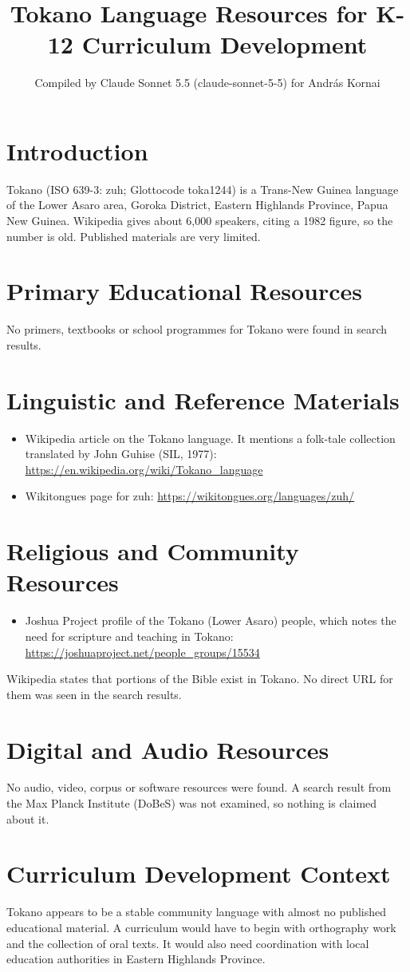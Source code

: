 \documentclass[12pt]{article}
\title{Tokano Language Resources for K-12 Curriculum Development}
\author{Compiled by Claude Sonnet 5.5 (claude-sonnet-5-5) for Andr\'as Kornai}
\date{}
\begin{document}
\maketitle

\section{Introduction}
Tokano (ISO 639-3: zuh; Glottocode toka1244) is a Trans-New Guinea language of the Lower Asaro area, Goroka District, Eastern Highlands Province, Papua New Guinea. Wikipedia gives about 6,000 speakers, citing a 1982 figure, so the number is old. Published materials are very limited.

\section{Primary Educational Resources}
No primers, textbooks or school programmes for Tokano were found in search results.

\section{Linguistic and Reference Materials}
\begin{itemize}
\item Wikipedia article on the Tokano language. It mentions a folk-tale collection translated by John Guhise (SIL, 1977): \url{https://en.wikipedia.org/wiki/Tokano_language}
\item Wikitongues page for zuh: \url{https://wikitongues.org/languages/zuh/}
\end{itemize}

\section{Religious and Community Resources}
\begin{itemize}
\item Joshua Project profile of the Tokano (Lower Asaro) people, which notes the need for scripture and teaching in Tokano: \url{https://joshuaproject.net/people_groups/15534}
\end{itemize}
Wikipedia states that portions of the Bible exist in Tokano. No direct URL for them was seen in the search results.

\section{Digital and Audio Resources}
No audio, video, corpus or software resources were found. A search result from the Max Planck Institute (DoBeS) was not examined, so nothing is claimed about it.

\section{Curriculum Development Context}
Tokano appears to be a stable community language with almost no published educational material. A curriculum would have to begin with orthography work and the collection of oral texts. It would also need coordination with local education authorities in Eastern Highlands Province.
\end{document}
